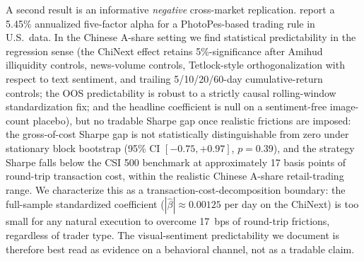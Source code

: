 \documentclass[AER]{AEA}
\begin{document}
A second result is an informative \emph{negative} cross-market replication. \citet{obaid2022picture} report a 5.45\% annualized five-factor alpha for a PhotoPes-based trading rule in U.S.\ data. In the Chinese A-share setting we find statistical predictability in the regression sense (the ChiNext effect retains 5\%-significance after Amihud illiquidity controls, news-volume controls, Tetlock-style orthogonalization with respect to text sentiment, and trailing 5/10/20/60-day cumulative-return controls; the OOS predictability is robust to a strictly causal rolling-window standardization fix; and the headline coefficient is null on a sentiment-free image-count placebo), but no tradable Sharpe gap once realistic frictions are imposed: the gross-of-cost Sharpe gap is not statistically distinguishable from zero under stationary block bootstrap (95\% CI $[-0.75, +0.97]$, $p=0.39$), and the strategy Sharpe falls below the CSI 500 benchmark at approximately 17 basis points of round-trip transaction cost, within the realistic Chinese A-share retail-trading range. We characterize this as a transaction-cost-decomposition boundary: the full-sample standardized coefficient ($|\hat\beta| \approx 0.00125$ per day on the ChiNext) is too small for any natural execution to overcome 17~bps of round-trip frictions, regardless of trader type. The visual-sentiment predictability we document is therefore best read as evidence on a behavioral channel, not as a tradable claim.
\end{document}
